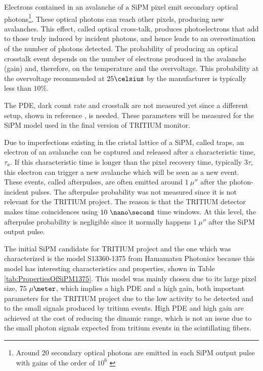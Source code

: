 Electrons contained in an avalanche of a SiPM pixel emit secondary optical photons\footnote{Around 20 secondary optical photons are emitted in each SiPM output pulse with gains of the order of $10^6$ \cite{CrosstalkProbability}}. These optical photons can reach other pixels, producing new avalanches. This effect, called optical cross-talk, produces photoelectrons that add to those truly induced by incident photons, and hence leads to an overestimation of the number of photons detected. The probability of producing an optical crosstalk event depends on the number of electrons produced in the avalanche (gain) and, therefore, on the temperature and the overvoltage. This probability at the overvoltage recommended at $25\celsius$ by the manufacturer is typically less than $10\%$.

The PDE, dark count rate and crosstalk are not measured yet since a different setup, shown in reference \cite{PDEStudy}, is needed. These parameters will be measured for the SiPM model used in the final version of TRITIUM monitor.

Due to imperfections existing in the cristal lattice of a SiPM, called traps, an electron of an avalanche can be captured and released after a characteristic time, $\tau_a$. If this characteristic time is longer than the pixel recovery time, typically $3\tau$, this electron can trigger a new avalanche which will be seen as a new event. These events, called  afterpulses, are often emitted around $1~\mu\second$ after the photon-incident pulses. The afterpulse probability was not measured since it is not relevant for the TRITIUM project. The reason is that the TRITIUM detector makes time coincidences using $10~\nano\second$ time windows. At this level, the afterpulse probability is negligible since it normally happens $1~\mu\second$ after the SiPM output pulse.

The initial SiPM candidate for TRITIUM project and the one which was characterized is the model S13360-1375 from Hamamatsu Photonics \cite{DataSheetHammamatsu_1_SiPM_1375} because this model has interesting characteristics and properties, shown in Table \ref{tab:PropertiesOfSiPM1375}. This model was mainly chosen due to its large pixel size, $75~\mu\meter$, which implies a high PDE and a high gain, both important parameters for the TRITIUM project due to the low activity to be detected and to the small signals produced by tritium events. High PDE and high gain are achieved at the cost of reducing the dinamic range, which is not an issue due to the small photon signals expected from tritium events in the scintillating fibers. 

